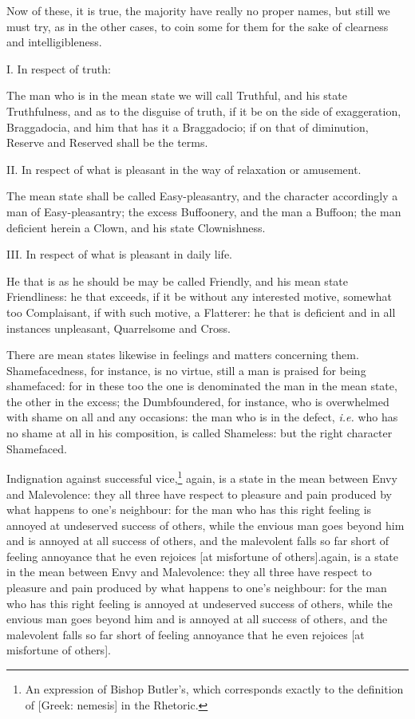 Now of these, it is true, the majority have really no proper names, but still
we must try, as in the other cases, to coin some for them for the sake of
clearness and intelligibleness.

I. In respect of truth:

The man who is in the mean state we will call Truthful, and his state
Truthfulness, and as to the disguise of truth, if it be on the side of
exaggeration, Braggadocia, and him that has it a Braggadocio; if on that of
diminution, Reserve and Reserved shall be the terms.

II. In respect of what is pleasant in the way of relaxation or amusement.

The mean state shall be called Easy-pleasantry, and the character accordingly a
man of Easy-pleasantry; the excess Buffoonery, and the man a Buffoon; the man
deficient herein a Clown, and his state Clownishness.

III. In respect of what is pleasant in daily life.

He that is as he should be may be called Friendly, and his mean state
Friendliness: he that exceeds, if it be without any interested motive, somewhat
too Complaisant, if with such motive, a Flatterer: he that is deficient and in
all instances unpleasant, Quarrelsome and Cross.

There are mean states likewise in feelings and matters concerning them.
Shamefacedness, for instance, is no virtue, still a man is praised for being
shamefaced: for in these too the one is denominated the man in the mean state,
the other in the excess; the Dumbfoundered, for instance, who is overwhelmed
with shame on all and any occasions: the man who is in the defect, \emph{i.e.}
who has no shame at all in his composition, is called Shameless: but the right
character Shamefaced.

Indignation against successful vice,\footnote{An expression of Bishop Butler’s, which corresponds exactly to the
definition of [Greek: nemesis] in the Rhetoric.}
again, is a state in the mean between Envy and Malevolence: they all three have
respect to pleasure and pain produced by what happens to one’s neighbour:
for the man who has this right feeling is annoyed at undeserved success of
others, while the envious man goes beyond him and is annoyed at all success of
others, and the malevolent falls so far short of feeling annoyance that he even
rejoices [at misfortune of others].again, is a state in the mean between Envy
and Malevolence: they all three have respect to pleasure and pain produced by
what happens to one’s neighbour: for the man who has this right feeling
is annoyed at undeserved success of others, while the envious man goes beyond
him and is annoyed at all success of others, and the malevolent falls so far
short of feeling annoyance that he even rejoices [at misfortune of others].

